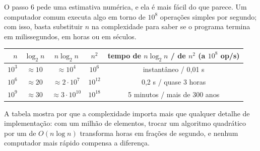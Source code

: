 O passo 6 pede uma estimativa numérica, e ela é mais fácil do que parece. Um computador comum executa algo em torno de $10^8$ operações simples por segundo; com isso, basta substituir $n$ na complexidade para saber se o programa termina em milissegundos, em horas ou em séculos.

\begin{center}\small
\begin{tabular}{@{}rcccc@{}}
\toprule
$n$ & $\log_2n$ & $n\log_2n$ & $n^2$ & tempo de $n\log_2n$ / de $n^2$ (a $10^8$ op/s)\\
\midrule
$10^3$ & $\approx10$ & $\approx10^4$ & $10^6$ & instantâneo / 0,01 s\\
$10^6$ & $\approx20$ & $\approx2\cdot10^7$ & $10^{12}$ & 0,2 s / quase 3 horas\\
$10^9$ & $\approx30$ & $\approx3\cdot10^{10}$ & $10^{18}$ & 5 minutos / mais de 300 anos\\
\bottomrule
\end{tabular}
\end{center}
A tabela mostra por que a complexidade importa mais que qualquer detalhe de implementação: com um milhão de elementos, trocar um algoritmo quadrático por um de $O(n\log n)$ transforma horas em frações de segundo, e nenhum computador mais rápido compensa a diferença.

